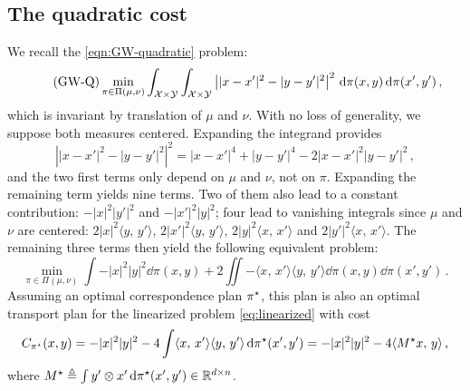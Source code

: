     \subsection{The quadratic cost}
    \label{subsec:applications_quadratic}
            We recall the \cref{eqn:GW-quadratic} problem:
            \begin{equation}
                \tag{GW-Q}
                \min _{\pi \in \Pi(\mu,\nu)} \int_{\mathcal{X}\times\mathcal{Y}}\int_{\mathcal{X}\times\mathcal{Y}}\left||x-x'|^2-|y-y'|^2\right|^{2} \,\mathrm d\pi(x, y) \,\mathrm d\pi(x', y')\,,
                \label{eqn:GW-quadratic-in-subsection}
            \end{equation}
     which is invariant by translation of $\mu$ and $\nu$. With no loss of generality, we suppose both measures centered. Expanding the integrand provides
            $$\left||x-x'|^{2}-|y-y'|^{2}\right|^2=|x-x'|^4+|y-y'|^4-2|x-x'|^{2}|y-y'|^{2}\,,$$
            and the two first terms only depend on $\mu$ and $\nu$, not on $\pi$. Expanding the remaining term yields nine terms. Two of them also lead to a constant contribution: $-|x|^2|y'|^2$ and $-|x'|^2|y|^2$; four lead to vanishing integrals since $\mu$ and $\nu$ are centered: $2|x|^{2}\langle y,\,y'\rangle$, $2|x'|^{2}\langle y,\,y'\rangle$, $2|y|^{2}\langle x,\,x'\rangle$ and $2|y'|^{2}\langle x,\,x'\rangle$. The remaining three terms then yield the following equivalent problem:
            \begin{equation*}
                \min _{\pi \in \Pi(\mu,\nu)} \int-|x|^2|y|^2\dd\pi(x, y)+2\iint-\langle x,\, x'\rangle\langle y,\, y'\rangle \dd\pi(x, y) \dd\pi(x', y')\,.
            \end{equation*}
            Assuming an optimal correspondence plan $\pi^\star$, this plan is also an optimal transport plan for the linearized problem \cref{eq:linearized} with cost
            \begin{align*}
                C_{\pi^\star}(x,y)=-|x|^2|y|^2-4\int\langle x,\, x'\rangle\langle y,\, y'\rangle \,\mathrm d\pi^\star(x', y') =-|x|^2|y|^2-4\langle M^\star x,\,y\rangle\,,
            \end{align*}
            where $M^\star\triangleq\int y'\otimes x' \,\mathrm d\pi^\star(x', y')\in \mathbb{R}^{d\times n}$.

